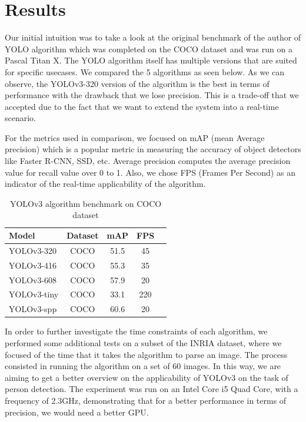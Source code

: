 \documentclass[runningheads,a4paper,11pt]{report}
\begin{document}
\section{Results}
\label{section:results}

Our initial intuition was to take a look at the original benchmark of the author of YOLO algorithm which was completed on the COCO dataset and was run on a Pascal Titan X. The YOLO algorithm itself has multiple versions that are suited for specific usecases. We compared the 5 algorithms as seen below. As we can observe, the YOLOv3-320 version of the algorithm is the best in terms of performance with the drawback that we lose precision. This is a trade-off that we accepted due to the fact that we want to extend the system into a real-time scenario.

For the metrics used in comparison, we focused on mAP (mean Average precision) which is a popular metric in measuring the accuracy of object detectors like Faster R-CNN, SSD, etc. Average precision computes the average precision value for recall value over 0 to 1. Also, we chose FPS (Frames Per Second) as an indicator of the real-time applicability of the algorithm.

\begin{table}[htbp]
	\caption{YOLOv3 algorithm benchmark on COCO dataset}
	\label{tab3COCO}
		\begin{center}
			\begin{tabular}{p{100pt}c c c c}

				\textbf{Model}& \textbf{Dataset}& \textbf{mAP}& \textbf{FPS} \\
				\hline\hline
 				YOLOv3-320& COCO& 51.5& 45 \\
 				YOLOv3-416& COCO& 55.3& 35 \\
 				YOLOv3-608& COCO& 57.9& 20 \\
 				YOLOv3-tiny& COCO& 33.1& 220 \\
 				YOLOv3-spp& COCO& 60.6& 20 \\
			\end{tabular}
		\end{center}
\end{table}


In order to further investigate the time constraints of each algorithm, we performed some additional tests on a subset of the INRIA dataset, where we focused of the time that it takes the algorithm to parse an image. The process consisted in running the algorithm on a set of 60 images. In this way, we are aiming to get a better overview on the applicability of YOLOv3 on the task of person detection. The experiment was run on an Intel Core i5 Quad Core, with a frequency of 2.3GHz, demonstrating that for a better performance in terms of precision, we would need a better GPU. 
\end{document}
